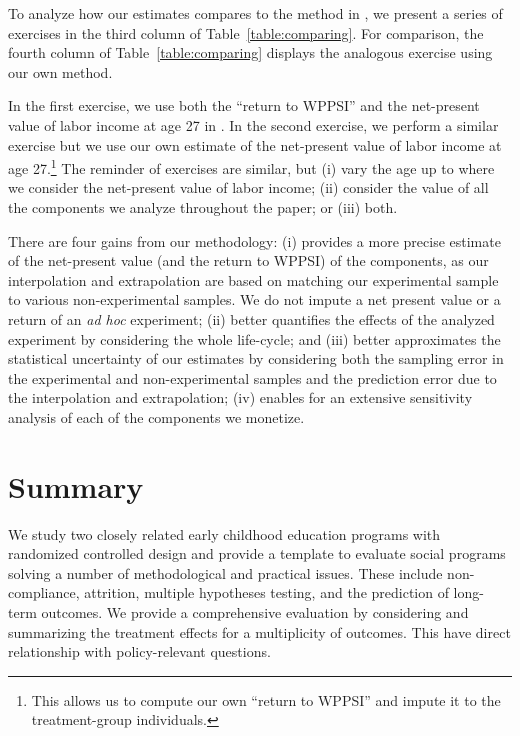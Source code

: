 To analyze how our estimates compares to the method in \citet{Kline_Walters_2016_QJE}, we present a series of exercises in the third column of Table~\ref{table:comparing}. For comparison, the fourth column of Table~\ref{table:comparing} displays the analogous exercise using our own method.

In the first exercise, we use both the ``return to WPPSI'' and the net-present value of labor income at age 27 in  \citet{Chetty_Friedman_etal_2011_QJoE}. In the second exercise, we perform a similar exercise but we use our own estimate of the net-present value of labor income at age 27.\footnote{This allows us to compute our own ``return to WPPSI'' and impute it to the treatment-group individuals.} The reminder of exercises are similar, but (i) vary the age up to where we consider the net-present value of labor income; (ii) consider the value of all the components we analyze throughout the paper; or (iii) both.

There are four gains from our methodology: (i) provides a more precise estimate of the net-present value (and the return to WPPSI) of the components, as our interpolation and extrapolation are based on matching our experimental sample to various non-experimental samples. We do not impute a net present value or a return of an \textit{ad hoc} experiment; (ii) better quantifies the effects of the analyzed experiment by considering the whole life-cycle; and (iii) better approximates the statistical uncertainty of our estimates by considering both the sampling error in the experimental and non-experimental samples and the prediction error due to the interpolation and extrapolation; (iv) enables for an extensive sensitivity analysis of each of the components we monetize.

\section{Summary} \label{section:conclusion}

We study two closely related early childhood education programs with randomized controlled design and provide a template to evaluate social programs solving a number of methodological and practical issues. These include non-compliance, attrition, multiple hypotheses testing, and the prediction of long-term outcomes. We provide a comprehensive evaluation by considering and summarizing the treatment effects for a multiplicity of outcomes. This have direct relationship with policy-relevant questions.

